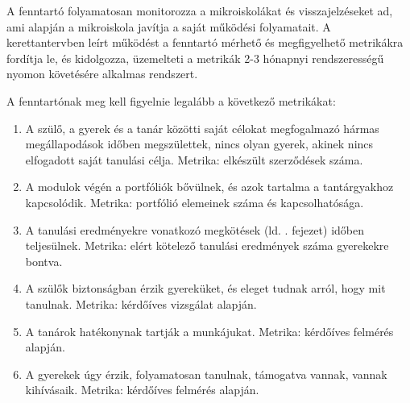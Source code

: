 A fenntartó folyamatosan monitorozza a mikroiskolákat és visszajelzéseket ad,
ami alapján a mikroiskola javítja a saját működési folyamatait. A kerettantervben leírt működést a
fenntartó mérhető és megfigyelhető metrikákra fordítja le, és kidolgozza,
üzemelteti a metrikák 2-3 hónapnyi rendszerességű nyomon követésére alkalmas
rendszert.

A fenntartónak meg kell figyelnie legalább a következő metrikákat:
\begin{enumerate}
      \item A szülő, a gyerek és a tanár közötti saját célokat megfogalmazó
            hármas
            megállapodások időben megszülettek, nincs olyan gyerek, akinek
            nincs
            elfogadott
            saját tanulási célja. Metrika: elkészült szerződések száma.

      \item A modulok végén a portfóliók bővülnek, és azok tartalma a
            tantárgyakhoz
            kapcsolódik. Metrika: portfólió elemeinek száma és kapcsolhatósága.
      \item A tanulási eredményekre vonatkozó megkötések
            (ld. . fejezet) időben teljesülnek.
            Metrika: elért kötelező tanulási eredmények száma gyerekekre
            bontva.

      \item A szülők biztonságban érzik gyereküket, és eleget tudnak arról,
            hogy
            mit
            tanulnak. Metrika: kérdőíves vizsgálat alapján.

      \item A tanárok hatékonynak tartják a munkájukat. Metrika: kérdőíves felmérés
            alapján.

      \item A gyerekek úgy érzik, folyamatosan tanulnak, támogatva vannak,
            vannak
            kihívásaik. Metrika: kérdőíves felmérés alapján.
\end{enumerate}
